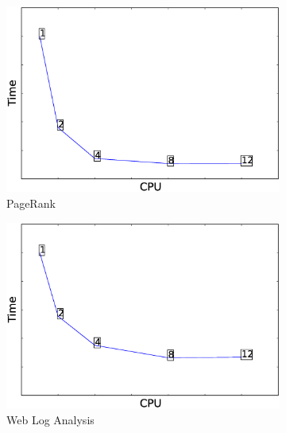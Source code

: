 \begin{figure}
	\captionsetup{justification=centering}
    \centering
	\begin{subfigure}[b]{0.3\textwidth}
        \includegraphics[width=\textwidth]{Chapter-CAT/figures/pagerank_cpu_elapsed_12_1.eps}
        \caption{PageRank}
        \label{fig:pagerank_time}
    \end{subfigure}
    \begin{subfigure}[b]{0.3\textwidth}
        \includegraphics[width=\textwidth]{Chapter-CAT/figures/webloganalysis_cpu_elapsed_12_1.eps}
        \caption{Web Log Analysis}
        \label{fig:webloganalysis_time}
    \end{subfigure}
    \begin{subfigure}[b]{0.3\textwidth}

\end{subfigure}
\end{figure}
